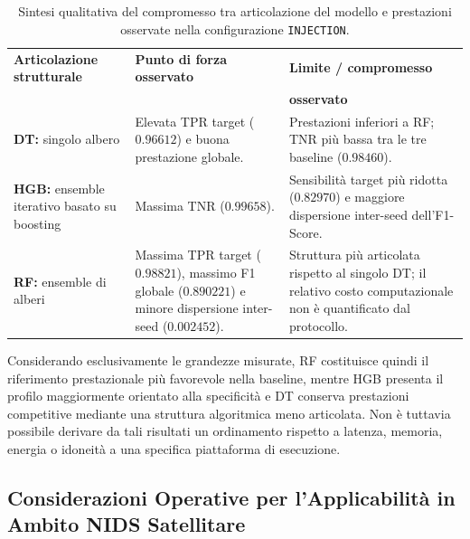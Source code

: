 \begin{table}[H]
    \centering
    \small
    \caption{Sintesi qualitativa del compromesso tra articolazione del modello e prestazioni osservate nella configurazione \texttt{INJECTION}.}
    \label{tab:cap5_classifier_tradeoff}
    \begin{tabularx}{\textwidth}{>{\raggedright\arraybackslash}X >{\raggedright\arraybackslash}X >{\raggedright\arraybackslash}X}
        \toprule
        \textbf{Articolazione strutturale} & \textbf{Punto di forza osservato} & \textbf{Limite / compromesso} \\[-5pt]
         & & \textbf{osservato} \\
        \midrule
        \textbf{DT:} singolo albero
        & Elevata TPR target ($0.96612$) e buona prestazione globale.
        & Prestazioni inferiori a RF; TNR più bassa tra le tre baseline ($0.98460$). \\
        \addlinespace
        \textbf{HGB:} ensemble iterativo basato su boosting
        & Massima TNR ($0.99658$).
        & Sensibilità target più ridotta ($0.82970$) e maggiore dispersione inter-seed dell'F1-Score. \\
        \addlinespace
        \textbf{RF:} ensemble di alberi
        & Massima TPR target ($0.98821$), massimo F1 globale ($0.890221$) e minore dispersione inter-seed ($0.002452$).
        & Struttura più articolata rispetto al singolo DT; il relativo costo computazionale non è quantificato dal protocollo. \\
        \bottomrule
    \end{tabularx}
\end{table}

Considerando esclusivamente le grandezze misurate, RF costituisce quindi il riferimento prestazionale più favorevole nella baseline, mentre HGB presenta il profilo maggiormente orientato alla specificità e DT conserva prestazioni competitive mediante una struttura algoritmica meno articolata. 
Non è tuttavia possibile derivare da tali risultati un ordinamento rispetto a latenza, memoria, energia o idoneità a una specifica piattaforma di esecuzione.



\subsection{Considerazioni Operative per l'Applicabilità in Ambito NIDS Satellitare}
\label{subsec:implicazioni_operative_nids}


